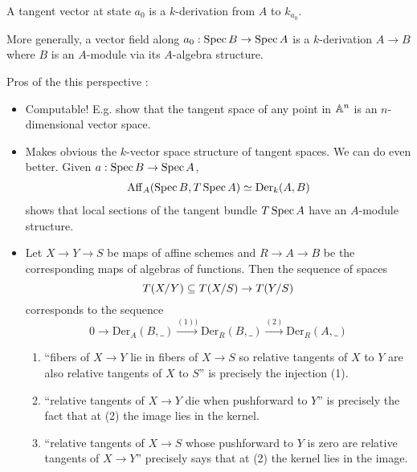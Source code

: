 \documentclass[./main.tex]{subfiles}
\begin{document}
\begin{dfn}
  
  A tangent vector at state $a_0$ is a 
  $k$-derivation from $A$ to $k_{a_0}$.

  More generally, a vector field along $a_0 : \operatorname{Spec} B \to \operatorname{Spec} A$
  is a $k$-derivation $A \to B$ where $B$ is an $A$-module via
  its $A$-algebra structure.
\end{dfn}

Pros of the this perspective : 
\begin{itemize}
  \item Computable!
  E.g. show that the tangent space of any point in $\mathbb{A}^n$ 
  is an $n$-dimensional vector space.
  \item Makes obvious the $k$-vector space structure of tangent spaces.
  We can do even better.
  Given $a : \operatorname{Spec} B \to \operatorname{Spec} A$,
  \begin{align*}
    \mathrm{Aff}_A (\operatorname{Spec} B , T\operatorname{Spec} A)
    \simeq \mathrm{Der}_k(A , B)
  \end{align*}
  shows that local sections of the tangent bundle $T\operatorname{Spec} A$
  have an $A$-module structure.

  \item Let $X \to Y \to S$ be maps of affine schemes and
  $R \to A \to B$ be the corresponding maps of algebras of functions.
  Then the sequence of spaces 
  \[
    T(X / Y) \subseteq T(X / S) \to T(Y / S)
  \]
  corresponds to the sequence 
  \[
    0 \to \mathrm{Der}_A(B , \_) \overset{(1))}{\to}
    \mathrm{Der}_R(B , \_) \overset{(2)}{\to} \mathrm{Der}_R(A , \_)
  \]
  \begin{enumerate}
    \item ``fibers of $X \to Y$ lie in fibers of $X \to S$ so
    relative tangents of $X$ to $Y$ are also relative tangents of $X$ to $S$''
    is precisely the injection (1).
    \item ``relative tangents of $X \to Y$ die when pushforward to $Y$''
    is precisely the fact that at (2)
    the image lies in the kernel.
    \item ``relative tangents of $X \to S$ whose pushforward to $Y$ is zero
    are relative tangents of $X \to Y$''
    precisely says that at (2) the kernel lies in the image.
  \end{enumerate}
  
\end{itemize}
\end{document}
